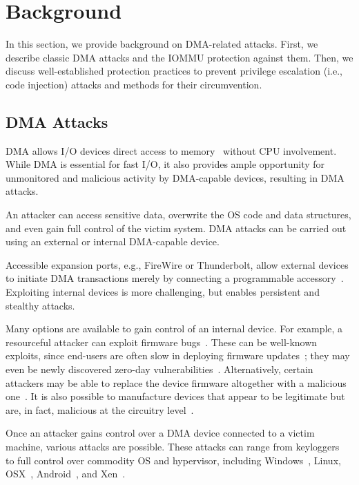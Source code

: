 \section{Background}\label{sec:background}

In this section, we provide background on DMA-related attacks. First, we describe classic DMA attacks and the IOMMU protection against them. Then, we discuss well-established protection practices to prevent privilege escalation (i.e., code injection) attacks and methods for their circumvention.

\subsection{DMA Attacks}

DMA allows I/O devices direct access to memory~\cite{oC54} without CPU involvement. While DMA is essential for fast I/O, it also provides ample opportunity for unmonitored and malicious activity by DMA-capable devices, resulting in DMA attacks. 

An attacker can access sensitive data, overwrite the OS code and data structures, and even gain full control of the victim system. DMA attacks can be carried out using an external or internal DMA-capable device. 

Accessible expansion ports, e.g., FireWire or Thunderbolt, allow external devices to initiate DMA transactions merely by connecting a programmable accessory~\cite{Dor04, Vol, MM, thunder}. 
Exploiting internal devices is more challenging, but enables persistent and stealthy attacks. 

Many options are available to gain control of an internal device.
For example, a resourceful attacker can exploit firmware bugs~\cite{SB12}. These can be well-known exploits, since end-users are often slow in deploying firmware updates~\cite{DPVL10}; they may even be newly discovered zero-day vulnerabilities~\cite{Ben17b}. Alternatively, certain attackers may be able to replace the device firmware altogether with a malicious one~\cite{ZKB13, NL14}. It is also possible to manufacture devices that appear to be legitimate but are, in fact, malicious at the circuitry level~\cite{YHD16}.

Once an attacker gains control over a DMA device connected to a victim machine, various attacks are possible. These attacks can range from keyloggers~\cite{LKV13, SB12} to full control over commodity OS and hypervisor, including Windows~\cite{AD10,thunder}, Linux, OSX~\cite{Fri16, thunder}, Android~\cite{Ben17b}, and Xen~\cite{Woj08}.

